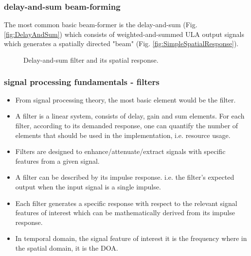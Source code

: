 \documentclass[10pt,pdflatex,headrule,landscape]{beamer}
\begin{document}
\begin{frame}
\frametitle{delay-and-sum beam-forming}
The most common basic beam-former is the delay-and-sum (Fig. \ref{fig:DelayAndSum}) which consists of weighted-and-summed ULA output signals which generates a spatially directed "beam" (Fig. \ref{fig:SimpleSpatialResponse}).
\begin{figure}%
    \centering
    \qquad
    \caption{Delay-and-sum filter and its spatial response.}
    \label{fig:delayAndSumArchAndResponse}    
\end{figure}
\end{frame}

\begin{frame}
\frametitle{signal processing fundamentals - filters}
\begin{itemize}
\item{
From signal processing theory, the most basic element would be the filter.
}
\item{
A filter is a linear system, consists of delay, gain and sum elements. For each filter, according to its demanded response, one can quantify the number of elements that should be used in the implementation, i.e. resource usage.
}
\item{
Filters are designed to enhance/attenuate/extract signals with specific features from a given signal.  
}
\item{
A filter can be described by its impulse response. i.e. the filter's expected output when the input signal is a single impulse.  
}
\item{
Each filter generates a specific response with respect to the relevant signal features of interest which can be mathematically derived from its impulse response.
}
\item{
In temporal domain, the signal feature of interest it is the frequency where in the spatial domain, it is the DOA.
}
\end{itemize}
\end{frame}
\end{document}
